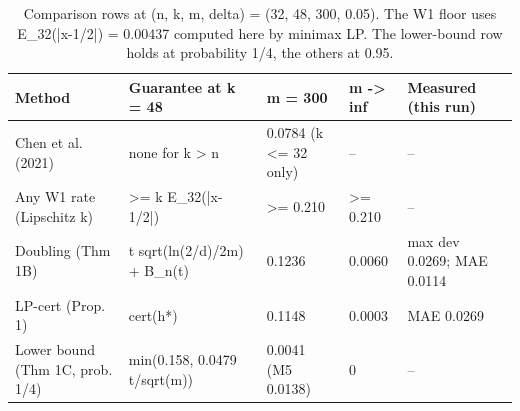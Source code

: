 \begin{table}[t]
\centering
\small
\begin{tabular}{p{1.35in}p{1.25in}p{1.0in}lp{1.1in}}
\toprule
Method & Guarantee at k = 48 & m = 300 & m -> inf & Measured (this run) \\
\midrule
Chen et al. (2021) & none for k > n & 0.0784 (k <= 32 only) & -- & -- \\
Any W1 rate (Lipschitz k) & >= k E\_32(|x-1/2|) & >= 0.210 & >= 0.210 & -- \\
Doubling (Thm 1B) & t sqrt(ln(2/d)/2m) + B\_n(t) & 0.1236 & 0.0060 & max dev 0.0269; MAE 0.0114 \\
LP-cert (Prop. 1) & cert(h*) & 0.1148 & 0.0003 & MAE 0.0269 \\
Lower bound (Thm 1C, prob. 1/4) & min(0.158, 0.0479 t/sqrt(m)) & 0.0041 (M5 0.0138) & 0 & -- \\
\bottomrule
\end{tabular}
\caption{Comparison rows at (n, k, m, delta) = (32, 48, 300, 0.05). The W1 floor uses E\_32(|x-1/2|) = 0.00437 computed here by minimax LP. The lower-bound row holds at probability 1/4, the others at 0.95.}
\label{tab:T4_sota_comparison_rows}
\end{table}
